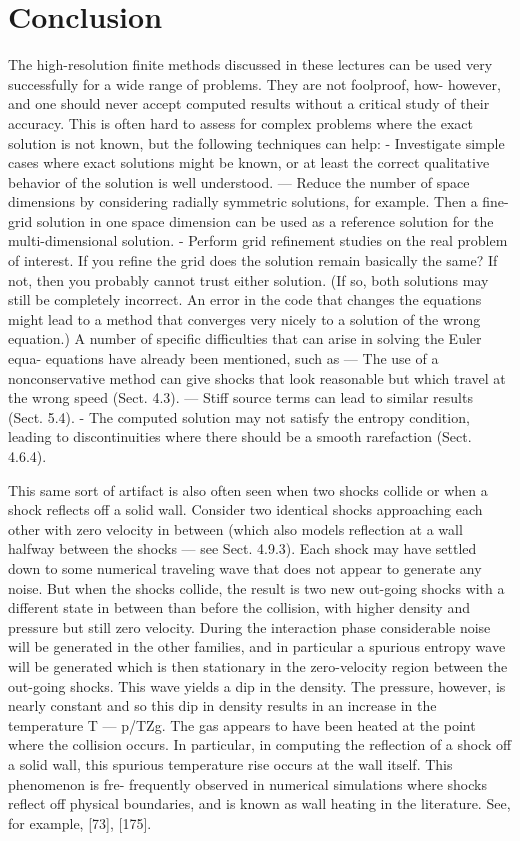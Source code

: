 \section{Conclusion}



The high-resolution finite methods discussed in these lectures can be used
very successfully for a wide range of problems. They are not foolproof, how-
however, and one should never accept computed results without a critical study
of their accuracy. This is often hard to assess for complex problems where
the exact solution is not known, but the following techniques can help:
- Investigate simple cases where exact solutions might be known, or at least
the correct qualitative behavior of the solution is well understood.
— Reduce the number of space dimensions by considering radially symmetric
solutions, for example. Then a fine-grid solution in one space dimension
can be used as a reference solution for the multi-dimensional solution.
- Perform grid refinement studies on the real problem of interest. If you
refine the grid does the solution remain basically the same? If not, then
you probably cannot trust either solution. (If so, both solutions may still
be completely incorrect. An error in the code that changes the equations
might lead to a method that converges very nicely to a solution of the
wrong equation.)
A number of specific difficulties that can arise in solving the Euler equa-
equations have already been mentioned, such as
— The use of a nonconservative method can give shocks that look reasonable
but which travel at the wrong speed (Sect. 4.3).
— Stiff source terms can lead to similar results (Sect. 5.4).
- The computed solution may not satisfy the entropy condition, leading to
discontinuities where there should be a smooth rarefaction (Sect. 4.6.4).

This same sort of artifact is also often seen when two shocks collide or when a
shock reflects off a solid wall. Consider two identical shocks approaching each
other with zero velocity in between (which also models reflection at a wall
halfway between the shocks — see Sect. 4.9.3). Each shock may have settled
down to some numerical traveling wave that does not appear to generate any
noise. But when the shocks collide, the result is two new out-going shocks
with a different state in between than before the collision, with higher density
and pressure but still zero velocity. During the interaction phase considerable
noise will be generated in the other families, and in particular a spurious
entropy wave will be generated which is then stationary in the zero-velocity
region between the out-going shocks. This wave yields a dip in the density.
The pressure, however, is nearly constant and so this dip in density results
in an increase in the temperature T — p/TZg. The gas appears to have been
heated at the point where the collision occurs.
In particular, in computing the reflection of a shock off a solid wall, this
spurious temperature rise occurs at the wall itself. This phenomenon is fre-
frequently observed in numerical simulations where shocks reflect off physical
boundaries, and is known as wall heating in the literature. See, for example,
[73], [175].


